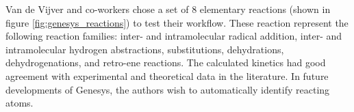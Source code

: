 \documentclass[preprint, 11pt]{elsarticle} %
\begin{document}

Van de Vijver and co-workers chose a set of 8 elementary reactions (shown in figure \ref{fig:genesys_reactions}) to test their workflow.
These reaction represent the following reaction families: inter- and intramolecular radical addition, inter- and intramolecular hydrogen abstractions, substitutions, dehydrations, dehydrogenations, and retro-ene reactions.
The calculated kinetics had good agreement with experimental and theoretical data in the literature.
In future developments of Genesys, the authors wish to automatically identify reacting atoms.
\end{document}
